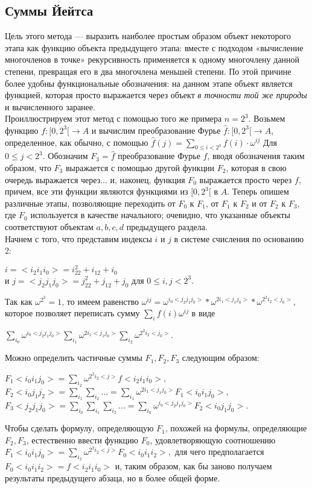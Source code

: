 \documentclass{mai_book}
\begin{document}
\subsection{ Суммы Йейтса}
Цель этого метода — выразить наиболее простым образом объект
некоторого этапа как функцию объекта предыдущего этапа: вместе с
подходом «вычисление многочленов в точке» рекурсивность 
применяется к одному многочлену данной степени, превращая его в два 
многочлена меньшей степени. По этой причине более удобны 
функциональные обозначения: на данном этапе объект является функцией, которая
просто выражается через объект \textit{в точности той же природы} и 
вычисленного заранее.\\
Проиллюстрируем этот метод с помощью того же примера $n=2^3$.
Возьмем функцию $f : [0,2^3[ \longrightarrow A$ и вычислим преобразование 
Фурье $\hat{f}: [0,2^3[ \longrightarrow A$, определенное, как обычно, с помощью $\hat{f}(j) =
\sum_{0 \leq i < 2^3} f(i) \cdot \omega^{ij}$ Для $0 \leq j < 2^3$. Обозначим $F_3 = \hat{f}$ преобразование
Фурье $f$, вводя обозначения таким образом, что $F_3$ выражается с 
помощью другой функции $F_2$, которая в свою очередь выражается через...
и, наконец, функция $F_0$ выражается просто через $f$, причем, все эти
функции являются функциями из $[0,2^3[$ в $A$. Теперь опишем различные
этапы, позволяющие переходить от $F_0$ к $F_1$, от $F_1$ к $F_2$ и от $F_2$ к $F_3$,
где $F_0$ используется в качестве начального; очевидно, что указанные
объекты соответствуют объектам $a, b, c, d$ предыдущего раздела.\\
Начнем с того, что представим индексы $i$ и $j$ в системе счисления
по основанию 2:\\
\begin{center}
$i = <i_2i_1i_0>=i_22^2 + i_12+i_0$\\
и $j=<j_2j_1j_0>=j_22^2+j_12+j_0$ для $0 \leq i, j < 2^3.$
\end{center}
Так как $\omega^{2^3}=1$, то имеем равенство $\omega^{ij} = \omega^{i_0<j_2j_1j_0>} \ast \omega^{2i_1<j_1j_0>} \ast \omega^{2^2i_2<j_0>},$
которое позволяет переписать сумму $\sum_i f(i) \omega^{ij}$ в виде\\
\begin{center}
$\sum\limits_{i_0}\omega^{i_0<j_2j_1j_0>} \sum\limits_{i_1}\omega^{2i_1<j_1j_0>} \sum\limits_{i_2}\omega^{2^2i_2<j_0>}.$
\end{center}
Можно определить частичные суммы $F_1,F_2,F_3$ следующим образом:
\begin{flushleft}
$F_1<i_0i_1j_0>=\sum_{i_2} \omega^{{2^2}i_2<j>} f<i_2i_1i_0>,$\\
$F_2<i_0j_1j_2>=\sum_{i_1} \sum_{i_2} ... = \sum_{i_1} \omega^{{2i_1}<j_1j_0>} F_1<i_0i_1j_0>,$\\
$F_3<j_2j_1j_0>=\sum_{i_0}\sum_{i_1}\sum_{i_2} ...=\sum_{i_0} \omega^{i_0<j_2j_1j_0>} F_2<i_0j_1j_0>.$
\end{flushleft}
Чтобы сделать формулу, определяющую $F_1$, похожей на формулы, 
определяющие $F_2,F_3$, естественно ввести функцию $F_0$, удовлетворяющую
соотношению $F_1<i_0i_1j_0>=\sum_{i_2} \omega^{{2^2}i_2<j>} F_0<i_0i_1i_2>,$ для чего 
предполагается\\ $F_0<i_0i_1i_2>=f<i_2i_1i_0>$ и, таким образом, как бы заново получаем
результаты предыдущего абзаца, но в более общей форме.
\end{document}
